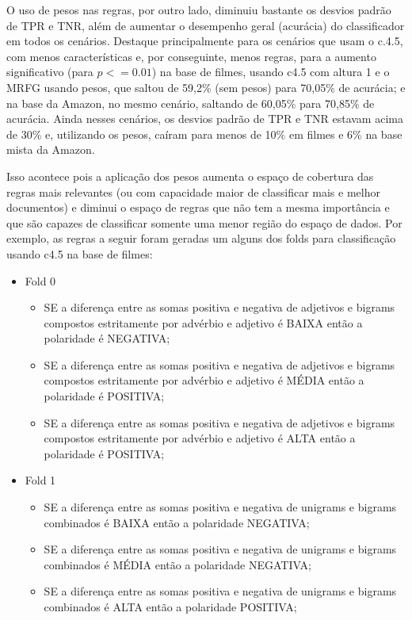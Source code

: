 \documentclass[template.tex]{subfiles}
\begin{document}
O uso de pesos nas regras, por outro lado, diminuiu bastante os desvios padrão de TPR e TNR, além de aumentar o desempenho geral (acurácia) do classificador em todos os cenários. Destaque principalmente para os cenários que usam o c.4.5, com menos características e, por conseguinte, menos regras, para a aumento significativo (para $p <= 0.01$) na base de filmes, usando c4.5 com altura 1 e o MRFG usando pesos, que saltou de 59,2\% (sem pesos) para 70,05\% de acurácia; e na base da Amazon, no mesmo cenário, saltando de 60,05\% para 70,85\% de acurácia. Ainda nesses cenários, os desvios padrão de TPR e TNR estavam acima de 30\% e, utilizando os pesos, caíram para menos de 10\% em filmes e 6\% na base mista da Amazon.

Isso acontece pois a aplicação dos pesos aumenta o espaço de cobertura das regras mais relevantes (ou com capacidade maior de classificar mais e melhor documentos) e diminui o espaço de regras que não tem a mesma importância e que são capazes de classificar somente uma menor região do espaço de dados. Por exemplo, as regras a seguir foram geradas um alguns dos folds para classificação usando c4.5 na base de filmes:

\begin{itemize}
\item Fold 0
\begin{itemize}
\item SE a diferença entre as somas positiva e negativa de adjetivos e bigrams compostos estritamente por advérbio e adjetivo é BAIXA então a polaridade é NEGATIVA;
\item SE a diferença entre as somas positiva e negativa de adjetivos e bigrams compostos estritamente por advérbio e adjetivo é MÉDIA então a polaridade é POSITIVA;
\item SE a diferença entre as somas positiva e negativa de adjetivos e bigrams compostos estritamente por advérbio e adjetivo é ALTA então a polaridade é POSITIVA;
\end{itemize}
\item Fold 1
\begin{itemize}
\item SE a diferença entre as somas positiva e negativa de unigrams e bigrams combinados é BAIXA então a polaridade NEGATIVA;
\item SE a diferença entre as somas positiva e negativa de unigrams e bigrams combinados é MÉDIA então a polaridade NEGATIVA;
\item SE a diferença entre as somas positiva e negativa de unigrams e bigrams combinados é ALTA então a polaridade POSITIVA;
\end{itemize}
\end{itemize}
\end{document}
